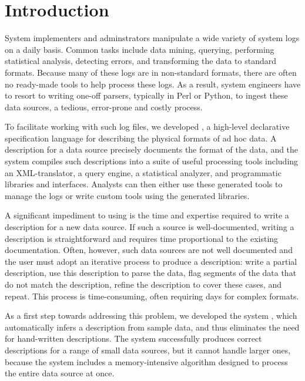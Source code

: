\section{Introduction}
\label{sec:intro}

System implementers and adminstrators manipulate a wide
variety of system logs on a daily basis.
Common tasks include data mining, querying, performing statistical analysis,
detecting errors, and transforming the data to standard formats.
Because many of these logs are in non-standard formats,
there are often no ready-made tools to help process these logs.
As a result, system engineers have to resort to writing one-off
parsers, typically in Perl or Python, to ingest these data sources,
a tedious, error-prone and costly process. 

To facilitate working with such log files, we developed \pads
\cite{fisher+:pads,fisher+:popl06,padsweb}, a high-level declarative
specification language for describing the physical formats of ad hoc
data. A \pads{} description for a data source precisely documents the
format of the data, and the \pads{} system compiles such descriptions
into a suite of useful processing tools including an XML-translator, a
query engine, a statistical analyzer, and programmatic libraries and
interfaces. Analysts can then either use these generated tools to
manage the logs or write custom tools using the generated libraries.

A significant impediment to using \pads{} is the time and 
expertise required to write a \pads{} description for a new data
source.  If such a source is well-documented, writing a \pads{}
description is straightforward and requires time proportional to the
existing documentation.  Often, however, such data sources are not
well documented and the user must adopt an iterative process to produce
a description: write a partial description, use this description to
parse the data, flag segments of the data that do not match the
description, refine the description to cover these cases, and repeat.
This process is time-consuming, often requiring days for complex
formats. 

As a first step towards addressing this problem, we developed the
\learnpads{} system \cite{Fisher+:dirttoshovels,xi08:tokenization},
which automatically infers a \pads{} description from sample data, and
thus eliminates the need for hand-written descriptions. The
\learnpads{} system successfully produces correct descriptions for a
range of small data sources, but it cannot handle larger ones, because
the system includes a memory-intensive algorithm designed to process
the entire data source at once.

